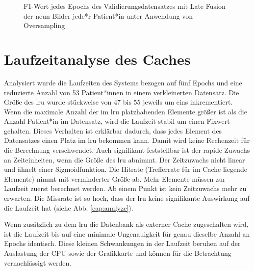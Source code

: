 \begin{figure}[b]\centering
\makebox[0pt]{}
\caption[F1-Wert jedes Epochs des Validierungsdatensatzes mit Late Fusion unter Anwendung von Oversampling]{F1-Wert jedes Epochs des Validierungsdatensatzes mit Late Fusion der neun Bilder jede*r Patient*in unter Anwendung von Oversampling}\label{cap:f1_lf_oversampling}
\end{figure}\label{fig:f1_lf_oversampling}






















\clearpage
\section{Laufzeitanalyse des Caches}\label{analyze}
Analysiert wurde die Laufzeiten des Systems bezogen auf fünf Epochs und eine reduzierte Anzahl von 53 Patient*innen in einem verkleinerten Datensatz. Die Größe des \ac{lru} wurde stückweise von $47$ bis $55$ jeweils um eins inkrementiert. Wenn die maximale Anzahl der im \ac{lru} platzhabenden Elemente größer ist als die Anzahl Patient*in im Datensatz, wird die Laufzeit stabil um einen Fixwert gehalten. Dieses Verhalten ist erklärbar dadurch, dass jedes Element des Datensatzes einen Platz im \ac{lru} bekommen kann. Damit wird keine Rechenzeit für die Berechnung verschwendet. Auch signifikant feststellbar ist der rapide Zuwachs an Zeiteinheiten, wenn die Größe des \ac{lru} abnimmt. Der Zeitzuwachs nicht linear und ähnelt einer Sigmoidfunktion. Die Hitrate (Trefferrate für im Cache liegende Elemente) nimmt mit verminderter Größe ab. Mehr Elemente müssen zur Laufzeit zuerst berechnet werden. Ab einem Punkt ist kein Zeitzuwachs mehr zu erwarten. Die Missrate ist so hoch, dass der \ac{lru} keine signifikante Auswirkung auf die Laufzeit hat (siehe Abb. \ref{cap:analyze}).

Wenn zusätzlich zu dem \ac{lru} die Datenbank als externer Cache zugeschalten wird, ist die Laufzeit bis auf eine minimale Ungenauigkeit für genau dieselbe Anzahl an Epochs identisch. Diese kleinen Schwankungen in der Laufzeit beruhen auf der Auslastung der CPU sowie der Grafikkarte und können für die Betrachtung vernachlässigt werden.


